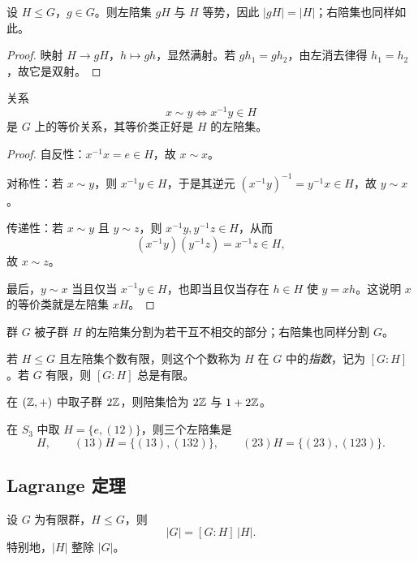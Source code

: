 \begin{proposition}
设 $H\le G$，$g\in G$。则左陪集 $gH$ 与 $H$ 等势，因此 $|gH|=|H|$；右陪集也同样如此。
\end{proposition}

\begin{proof}
映射 $H\to gH$，$h\mapsto gh$，显然满射。若 $gh_1=gh_2$，由左消去律得 $h_1=h_2$，故它是双射。
\end{proof}

\begin{proposition}
关系
\[
 x\sim y \iff x^{-1}y \in H
\]
是 $G$ 上的等价关系，其等价类正好是 $H$ 的左陪集。
\end{proposition}

\begin{proof}
自反性：$x^{-1}x=e\in H$，故 $x\sim x$。

对称性：若 $x\sim y$，则 $x^{-1}y\in H$，于是其逆元 $(x^{-1}y)^{-1}=y^{-1}x\in H$，故 $y\sim x$。

传递性：若 $x\sim y$ 且 $y\sim z$，则 $x^{-1}y,y^{-1}z\in H$，从而
\[
(x^{-1}y)(y^{-1}z)=x^{-1}z \in H,
\]
故 $x\sim z$。

最后，$y\sim x$ 当且仅当 $x^{-1}y\in H$，也即当且仅当存在 $h\in H$ 使 $y=xh$。这说明 $x$ 的等价类就是左陪集 $xH$。
\end{proof}

\begin{corollary}
群 $G$ 被子群 $H$ 的左陪集分割为若干互不相交的部分；右陪集也同样分割 $G$。
\end{corollary}

\begin{definition}
若 $H\le G$ 且左陪集个数有限，则这个个数称为 $H$ 在 $G$ 中的\emph{指数}，记为 $[G:H]$。若 $G$ 有限，则 $[G:H]$ 总是有限。
\end{definition}

\begin{example}
在 $(\mathbb{Z},+)$ 中取子群 $2\mathbb{Z}$，则陪集恰为 $2\mathbb{Z}$ 与 $1+2\mathbb{Z}$。

在 $S_3$ 中取 $H=\{e,(12)\}$，则三个左陪集是
\[
H, \qquad (13)H=\{(13),(132)\}, \qquad (23)H=\{(23),(123)\}.
\]
\end{example}

\subsection*{Lagrange 定理}

\begin{theorem}[Lagrange 定理]
设 $G$ 为有限群，$H\le G$，则
\[
 |G|=[G:H]\,|H|.
\]
特别地，$|H|$ 整除 $|G|$。
\end{theorem}

